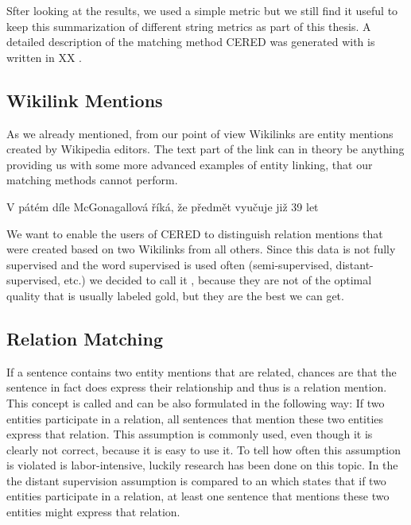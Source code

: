 \vspace{2mm}
Sfter looking at the results, we used a simple metric but we still find it useful to keep this summarization of different string metrics as part of this thesis. A detailed description of the matching method CERED was generated with is written in XX .


\subsection{Wikilink Mentions}

As we already mentioned, from our point of view Wikilinks are entity mentions created by Wikipedia editors. The text part of the link can in theory be anything providing us with some more advanced examples of entity linking, that our matching methods cannot perform.

V pátém díle McGonagallová říká, že předmět vyučuje již 39 let

We want to enable the users of CERED to distinguish relation mentions that were created based on two Wikilinks from all others. Since this data is not fully supervised and the word supervised is used often  (semi-supervised, distant-supervised, etc.) we decided to call it , because they are not of the optimal quality that is usually labeled gold, but they are the best we can get.


\subsection{Relation Matching}
If a sentence contains two entity mentions that are related, chances are that the sentence in fact does express their relationship and thus is a relation mention. This concept is called  and can be also formulated in the following way: If two entities participate in a relation, all sentences that  mention these two entities express that relation. This assumption is commonly used, even though it is clearly not correct, because it is easy to use it. To tell how often this assumption is violated is labor-intensive, luckily research has been done on this topic. In the \cite{nytdistant}  the distant supervision assumption is compared to an  which states that if two entities participate in a relation, at least one sentence that mentions these two entities might express that relation. 

